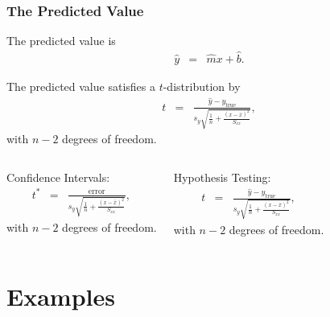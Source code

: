 \begin{frame}
  \frametitle{The Predicted Value}

  The predicted value is 
  \begin{eqnarray*}
    \hat{y} & = & \hat{m} x + \hat{b}.
  \end{eqnarray*}


  The predicted value  satisfies a $t$-distribution by
  \begin{eqnarray*}
    t & = & \frac{\hat{y}-y_{\mathrm{true}}}{s_y \sqrt{\frac{1}{n}+\frac{(x-\bar{x})^2}{S_{xx}}}},
  \end{eqnarray*}
  with $n-2$ degrees of freedom.

  {

    \begin{columns}

      Confidence Intervals:
      \begin{eqnarray*}
        t^* & = & \frac{\mathrm{error}}{s_y \sqrt{\frac{1}{n}+\frac{(x-\bar{x})^2}{S_{xx}}}},
      \end{eqnarray*}
      with $n-2$ degrees of freedom.


      Hypothesis Testing:
      \begin{eqnarray*}
        t & = & \frac{\hat{y}-y_{\mathrm{true}}}{s_y \sqrt{\frac{1}{n}+\frac{(x-\bar{x})^2}{S_{xx}}}},
      \end{eqnarray*}
      with $n-2$ degrees of freedom.

    
    \end{columns}
  }


\end{frame}

\section{Examples}

